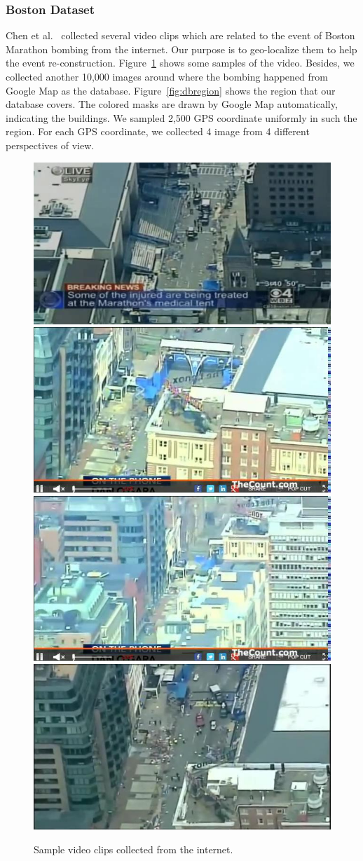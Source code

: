 \subsubsection{Boston Dataset}
\par 
Chen et al.~\cite{chen2016boston} collected several video clips which are related to the event of Boston Marathon bombing from the internet. Our purpose is to geo-localize them to help the event re-construction. Figure~\ref{fig:bostonvideo} shows some samples of the video. Besides, we collected another 10,000 images around where the bombing happened from Google Map as the database. Figure~\ref{fig:dbregion} shows the region that our database covers. The colored masks are drawn by Google Map automatically, indicating the buildings. We sampled 2,500 GPS coordinate uniformly in such the region. For each GPS coordinate, we collected 4 image from 4 different perspectives of view. 
\begin{figure}[htbp]
\includegraphics[width=0.45\linewidth]{img/video_1}
\includegraphics[width=0.45\linewidth]{img/video_2}
\\[0.1cm]
\includegraphics[width=0.45\linewidth]{img/video_3}
\includegraphics[width=0.45\linewidth]{img/video_4}
\caption{Sample video clips collected from the internet.}
\label{fig:bostonvideo}
\end{figure}
